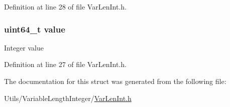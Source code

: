 Definition at line 28 of file VarLenInt.h.

\hypertarget{struct_m_i_var_len_int_a4e630859cc0e2a22bd6acf39a6a8e218}{
\subsubsection[{value}]{\setlength{\rightskip}{0pt plus 5cm}uint64\_\-t {\bf value}}}
\label{struct_m_i_var_len_int_a4e630859cc0e2a22bd6acf39a6a8e218}
Integer value 

Definition at line 27 of file VarLenInt.h.



The documentation for this struct was generated from the following file:\begin{DoxyCompactItemize}
\item 
Utils/VariableLengthInteger/\hyperlink{_m_i_var_len_int_8h}{VarLenInt.h}\end{DoxyCompactItemize}
